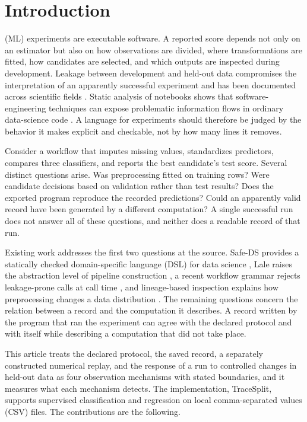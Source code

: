 \documentclass[lettersize,journal]{IEEEtran}
\newcommand{\tool}{TraceSplit}
\begin{document}
\section{Introduction}
 (ML) experiments are executable software. A reported score depends not only on an estimator but also on how observations are divided, where transformations are fitted, how candidates are selected, and which outputs are inspected during development. Leakage between development and held-out data compromises the interpretation of an apparently successful experiment and has been documented across scientific fields \cite{kapoor2023}. Static analysis of notebooks shows that software-engineering techniques can expose problematic information flows in ordinary data-science code \cite{yang2022,urban2025}. A language for experiments should therefore be judged by the behavior it makes explicit and checkable, not by how many lines it removes.

Consider a workflow that imputes missing values, standardizes predictors, compares three classifiers, and reports the best candidate's test score. Several distinct questions arise. Was preprocessing fitted on training rows? Were candidate decisions based on validation rather than test results? Does the exported program reproduce the recorded predictions? Could an apparently valid record have been generated by a different computation? A single successful run does not answer all of these questions, and neither does a readable record of that run.

Existing work addresses the first two questions at the source. Safe-DS provides a statically checked domain-specific language (DSL) for data science \cite{safeds2023}, Lale raises the abstraction level of pipeline construction \cite{lale2020}, a recent workflow grammar rejects leakage-prone calls at call time \cite{roth2026}, and lineage-based inspection explains how preprocessing changes a data distribution \cite{mlinspect2021}. The remaining questions concern the relation between a record and the computation it describes. A record written by the program that ran the experiment can agree with the declared protocol and with itself while describing a computation that did not take place.

This article treats the declared protocol, the saved record, a separately constructed numerical replay, and the response of a run to controlled changes in held-out data as four observation mechanisms with stated boundaries, and it measures what each mechanism detects. The implementation, \tool{}, supports supervised classification and regression on local comma-separated values (CSV) files. The contributions are the following.
\end{document}
